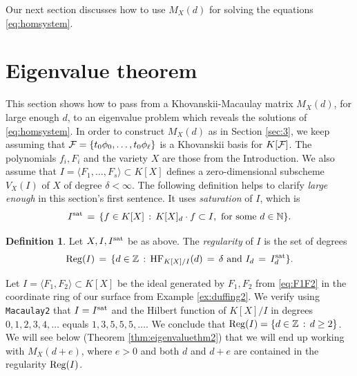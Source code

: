\documentclass[12pt]{article}
\theoremstyle{definition}
\newenvironment{example}
  {\pushQED{\qed}\renewcommand{\qedsymbol}{$\diamond$}\examplex}
  {\popQED\endexamplex}
\newtheorem{defn}[thm]{Definition}
\theoremstyle{remark}
\begin{document}
Our next section discusses how to use $M_X(d)$ for solving the equations \eqref{eq:homsystem}.

\section{Eigenvalue theorem} \label{sec:4}
This section shows how to pass from a Khovanskii-Macaulay matrix $M_X(d)$, for large enough $d$, to an eigenvalue problem which reveals the solutions of \eqref{eq:homsystem}. In order to construct $M_X(d)$ as in Section \ref{sec:3}, we keep assuming that ${\cal F} = \{ t_0\phi_0, \ldots, t_0 \phi_\ell \}$ is a Khovanskii basis for $K[{\cal F}]$. The polynomials $f_i, F_i$ and the variety $X$ are those from the Introduction. We also assume that $I = \langle F_1, \ldots, F_s \rangle \subset K[X]$ defines a zero-dimensional subscheme $V_X(I)$ of $X$ of degree $\delta < \infty$. 
The following definition helps to clarify \emph{large enough} in this section's first sentence. It uses \emph{saturation} of $I$, which is 
\begin{equation}\label{def:saturation}
I^{\rm sat} \, = \, \{ f \in K[X] \, : \, K[X]_d \cdot f \subset I, \text{ for some } d \in \mathbb{N} \}.     
\end{equation} 

\begin{defn} \label{def:regularity}
Let $X, I, I^{\rm sat}$ be as above. The \emph{regularity} of $I$ is the set of degrees
\[ {\rm Reg}(I) \, = \, \{ d \in \mathbb{Z} \, : \, {\rm HF}_{K[X]/I}(d) \, = \,  \delta \text{ and } I_d \, = \, I_d^{\rm sat} \}. \]
\end{defn}
\begin{example} \label{ex:regduffing}
    Let $I = \langle F_1, F_2 \rangle \subset K[X]$ be the ideal generated by $F_1,F_2$ from \eqref{eq:F1F2} in the coordinate ring of our surface from Example \ref{ex:duffing2}. We verify using \texttt{Macaulay2} that $I = I^{\rm sat}$ and the Hilbert function of $K[X]/I$ in degrees $0,1,2,3,4,\ldots$ equals $1,3,5,5,5,\ldots$. We conclude that ${\rm Reg}(I) = \{ d \in \mathbb{Z} \, : \, d \geq 2\}$.
\end{example}
We will see below (Theorem \ref{thm:eigenvaluethm2}) that we will end up working with $M_{X}(d+e)$, where $e >0$ and both $d$ and $d+e$ are contained in the regularity ${\rm Reg}(I)$. 
\end{document}
